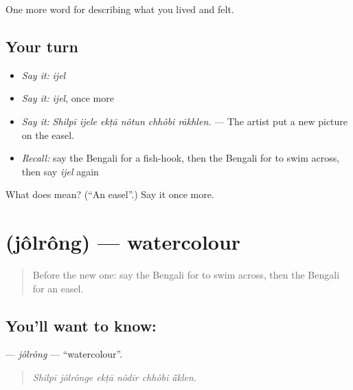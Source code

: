 \begin{grammarlens}[title={What you've built}]
One more word for describing what you lived and felt.
\end{grammarlens}

\subsection*{Your turn}
\begin{itemize}
\raggedright
  \item \emph{Say it:} \emph{ijel}
  \item \emph{Say it:} \emph{ijel}, once more
  \item \emph{Say it:} \emph{Shilpī ijele ekṭā nôtun chhôbi rākhlen.} — The artist put a new picture on the easel.
  \item \emph{Recall:} say the Bengali for a fish-hook, then the Bengali for to swim across, then say \emph{ijel} again
\end{itemize}

\begin{tcolorbox}[breakable,colback=teal!4,colframe=teal!35!black,title={Before you move on}]
What does  mean? (\textquotedblleft{}An easel\textquotedblright{}.) Say it once more.
\end{tcolorbox}
\section[\texorpdfstring{\bn{জলরং} (jôlrông)}{জলরং (jôlrông)}]{ (jôlrông) — watercolour}

\label{lesson:BN-C524-jolrong}



\begin{quote}
Before the new one: say the Bengali for to swim across, then the Bengali for an easel.
\end{quote}

\subsection*{You'll want to know: }
\textbf{} — \emph{jôlrông} — \textquotedblleft{}watercolour\textquotedblright{}.

\begin{quote}
     
\end{quote}

\begin{quote}
\emph{Shilpī jôlrônge ekṭā nôdīr chhôbi ā̃klen.}
\end{quote}

